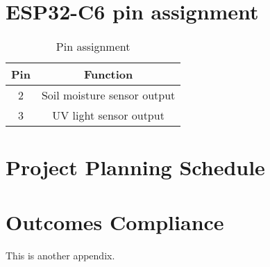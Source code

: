 \chapter{ESP32-C6 pin assignment}
\makeatletter{}\makeatother
\label{appen:derivations_bigramseg}

\begin{table}[!h]
    \centering
    \begin{tabular}{|c|c|}
        \hline
        Pin & Function \\
        \hline
        2 & Soil moisture sensor output \\
        3 & UV light sensor output \\
        \hline
    \end{tabular}
    \caption{Pin assignment}
    \label{tab:pin_assignment}
\end{table}

\chapter{Project Planning Schedule}
\makeatletter{}\makeatother
\label{appen:derivations_bigramseg}



\chapter{Outcomes Compliance}
\makeatletter{}\makeatother
\label{appen:derivations_bigramseg}

This is another appendix.
